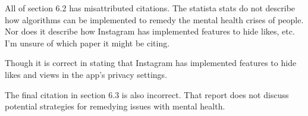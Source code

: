 \documentclass[12pt]{article}
\begin{document}
All of section 6.2 has misattributed citations. The statista stats do not describe how algorithms can be implemented to remedy the mental health crises of people. Nor does it describe how Instagram has implemented features to hide likes, etc. I'm unsure of which paper it might be citing.

Though it is correct in stating that Instagram has implemented features to hide likes and views in the app's privacy settings.

The final citation in section 6.3 is also incorrect. That report does not discuss potential strategies for remedying issues with mental health. 

\section{}
\end{document}
